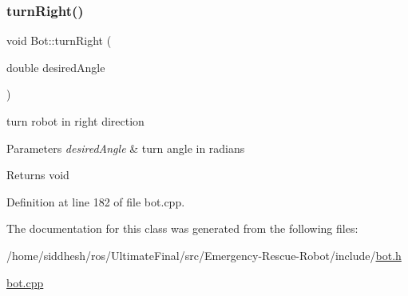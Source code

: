 \subsubsection{\texorpdfstring{turn\+Right()}{turnRight()}}
{\footnotesize\ttfamily void Bot\+::turn\+Right (\begin{DoxyParamCaption}\item[{double}]{desired\+Angle }\end{DoxyParamCaption})}



turn robot in right direction 


\begin{DoxyParams}{Parameters}
{\em desired\+Angle} & turn angle in radians \\
\hline
\end{DoxyParams}
\begin{DoxyReturn}{Returns}
void 
\end{DoxyReturn}


Definition at line 182 of file bot.\+cpp.



The documentation for this class was generated from the following files\+:\begin{DoxyCompactItemize}
\item 
/home/siddhesh/ros/\+Ultimate\+Final/src/\+Emergency-\/\+Rescue-\/\+Robot/include/\mbox{\hyperlink{bot_8h}{bot.\+h}}\item 
\mbox{\hyperlink{bot_8cpp}{bot.\+cpp}}\end{DoxyCompactItemize}
